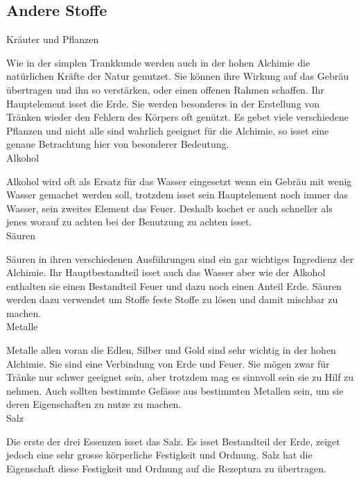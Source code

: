 \documentclass[a5paper,8pt]{book}
\begin{document}
\subsection{Andere Stoffe}

\noindent Kräuter und Pflanzen\

Wie in der simplen Trankkunde werden auch in der hohen Alchimie die natürlichen Kräfte der Natur genutzet. Sie können ihre Wirkung auf das Gebräu übertragen und 
ihn so verstärken, oder einen offenen Rahmen schaffen. Ihr Hauptelement isset die Erde. Sie werden besonderes in der Erstellung von Tränken wieder den Fehlern des 
Körpers oft genützt. Es gebet viele verschiedene Pflanzen und nicht alle sind wahrlich geeignet für die Alchimie, so isset eine genaue Betrachtung hier von 
besonderer Bedeutung.\\

\noindent Alkohol\

Alkohol wird oft als Ersatz für das Wasser eingesetzt wenn ein Gebräu mit wenig Wasser gemachet werden soll, trotzdem isset sein Hauptelement noch immer das Wasser, 
sein zweites Element das Feuer. Deshalb kochet er auch schneller als jenes worauf zu achten bei der Benutzung zu achten isset. \\

\noindent Säuren\

Säuren in ihren verschiedenen Ausführungen sind ein gar wichtiges Ingredienz der Alchimie. Ihr Hauptbestandteil isset auch das Wasser aber wie der 
Alkohol enthalten sie einen Bestandteil Feuer und dazu noch einen Anteil Erde. Säuren werden dazu verwendet um Stoffe feste Stoffe zu lösen und damit mischbar zu machen. \\

\noindent Metalle\

Metalle allen voran die Edlen, Silber und Gold sind sehr wichtig in der hohen Alchimie. Sie sind eine Verbindung von Erde und Feuer. Sie mögen zwar für 
Tränke nur schwer geeignet sein, aber trotzdem mag es sinnvoll sein sie zu Hilf zu nehmen. Auch sollten bestimmte Gefässe aus bestimmten Metallen sein, 
um sie deren Eigenschaften zu nutze zu machen.\\

\noindent Salz\

Die erste der drei Essenzen isset das Salz. Es isset Bestandteil der Erde, zeiget jedoch eine sehr grosse körperliche Festigkeit und Ordnung. Salz hat die 
Eigenschaft diese Festigkeit und Ordnung auf die Rezeptura zu übertragen.\\
\end{document}
